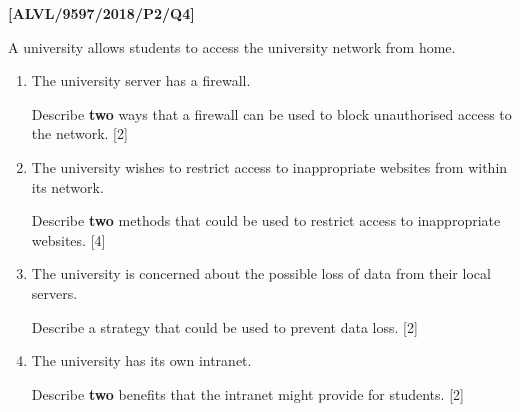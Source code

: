 \item \textbf{{[}ALVL/9597/2018/P2/Q4{]} }

A university allows students to access the university network from
home. 
\begin{enumerate}
\item The university server has a firewall.

Describe \textbf{two} ways that a firewall can be used to block unauthorised
access to the network. \hfill{}{[}2{]}
\item The university wishes to restrict access to inappropriate websites
from within its network.

Describe \textbf{two} methods that could be used to restrict access
to inappropriate websites. \hfill{}{[}4{]}
\item The university is concerned about the possible loss of data from their
local servers.

Describe a strategy that could be used to prevent data loss. \hfill{}{[}2{]}
\item The university has its own intranet.

Describe \textbf{two} benefits that the intranet might provide for
students. \hfill{}{[}2{]}
\end{enumerate}